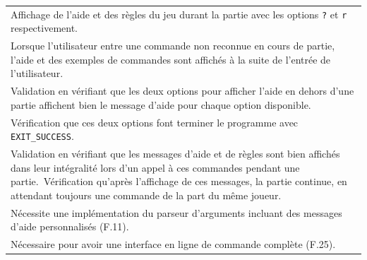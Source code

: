 \documentclass[a4paper,12pt]{article}
\begin{document}
\begin{tabularx}{\textwidth}{|X|}
    Affichage de l’aide et des règles du jeu durant la partie avec les options
    \texttt{?} et \texttt{r} respectivement.                                                                                                             \\ Lorsque l’utilisateur entre une
    commande non reconnue en cours de partie, l’aide et des exemples de commandes
    sont affichés à la suite de l’entrée de l’utilisateur.                                                                                               \\
    \arrayrulecolor{MediumAquamarine}\hline \arrayrulecolor{CornflowerBlue}
    Validation en vérifiant que les deux options pour afficher l’aide en dehors
    d’une partie affichent bien le message d’aide pour chaque option disponible.                                                                         \\
    Vérification que ces deux options font terminer le programme avec
    \texttt{EXIT\_SUCCESS}.                                                                                                                              \\ Validation en vérifiant que les messages d’aide et
    de règles sont bien affichés dans leur intégralité lors d’un appel à ces
    commandes pendant une partie.\ Vérification qu’après l’affichage de ces
    messages, la partie continue, en attendant toujours une commande de la part du
    même joueur.                                                                                                                                         \\ \arrayrulecolor{MediumAquamarine}\hline
    \arrayrulecolor{CornflowerBlue} Nécessite une implémentation du parseur
    d’arguments incluant des messages d’aide personnalisés (F.11).                                                                                       \\ Nécessaire
    pour avoir une interface en ligne de commande complète (F.25).                                                                                       \\ \hline
\end{tabularx}

\vspace{1cm}
\end{document}
